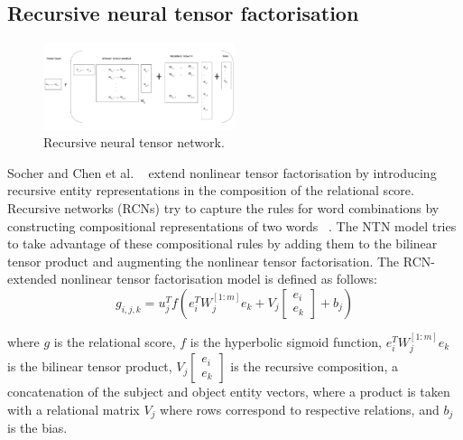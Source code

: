 \subsection{Recursive neural tensor factorisation}

\begin{figure}[H]
   	\centering
    	\includegraphics[width=0.5\textwidth, height=0.3\textwidth]{recursive_neural_tensor_network.png}
	\caption{Recursive neural tensor network.}
\end{figure}

Socher and Chen et al.  \unskip ~\citep{socher2013reasoning} extend nonlinear tensor factorisation by introducing recursive entity representations in the composition of the relational score. Recursive networks (RCNs) try to capture the rules for word combinations by constructing compositional representations of two words \unskip ~\citep{socher2012semantic}. The NTN model tries to take advantage of these compositional rules by adding them to the bilinear tensor product and augmenting the nonlinear tensor factorisation. The RCN-extended nonlinear tensor factorisation model is defined as follows:
\begin{equation}
	g_{i,j,k} =  u_j^Tf(e_i^TW_j^{\left [1:m \right ]} e_k + V_j \left [ \begin{matrix} e_i \\ e_k \end{matrix} \right ] + b_j)
\end{equation}

\noindent where $g$ is the relational score, $f$ is the hyperbolic sigmoid function, $e_i^TW_j^{\left [1:m \right ]} e_k $ is the bilinear tensor product, $V_j \left [ \begin{matrix} e_i \\ e_k \end{matrix} \right ]$ is the recursive composition, a concatenation of the subject and object entity vectors, where a product is taken with a relational matrix $ V_j $ where rows correspond to respective relations, and $ b_j $ is the bias. \par

